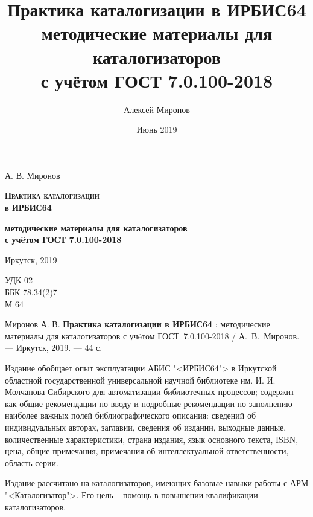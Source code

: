 \documentclass[a5paper,openany,10pt]{book}
\begin{document}
\frontmatter
\author{Алексей Миронов}
\title{Практика каталогизации в ИРБИС64\\
	{\large методические материалы для каталогизаторов\\
	\normalsize с учётом ГОСТ 7.0.100-2018
	}
}
\date{Июнь 2019}

\begin{titlepage}
\clearpage\vspace*{\fill}
\begin{center}
	{\Large А. В. Миронов}
	
	\vspace{55mm}
	{\sffamily
	{\Huge\textbf{\textsc{Практика каталогизации\\в ИРБИС64}}}
	\vspace{5mm}
	
	{\large \textbf{методические материалы для каталогизаторов\\с уч\"eтом ГОСТ 7.0.100-2018}}
    }
	\vspace{65mm}
	
	{\large Иркутск, 2019}
\end{center}
\vspace*{\fill}
\end{titlepage}

\clearpage
\thispagestyle{empty}
\noindent УДК 02 \\
ББК 78.34(2)7 \\
М 64

\vspace{8mm}

Миронов А. В. \textbf{Практика каталогизации в ИРБИС64} : методические материалы для каталогизаторов с уч\"eтом ГОСТ~7.0.100-2018 / А.~В.~Миронов. — Иркутск, 2019. — 44 с.


\vspace{8mm}

Издание обобщает опыт эксплуатации АБИС "<ИРБИС64"> в Иркутской областной государственной универсальной научной библиотеке им. И. И. Мол\-ча\-но\-ва-Сибирского для автоматизации библиотечных процессов; содержит как общие рекомендации по вводу и подробные рекомендации по заполнению наиболее важных полей библиографического описания: сведений об индивидуальных авторах, заглавии, сведения об издании, выходные данные, количественные характеристики, страна издания, язык основного текста, ISBN, цена, общие примечания, примечания об интеллектуальной ответственности, область серии.

\vspace{3mm}
Издание рассчитано на каталогизаторов, имеющих базовые навыки работы с АРМ "<Каталогизатор">. Его цель – помощь в повышении квалификации каталогизаторов.
\end{document}
